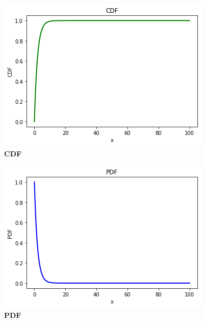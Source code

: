 \documentclass[journal,12pt,twocolumn]{IEEEtran}
\begin{document}
\begin{figure}
\includegraphics[width=\columnwidth]{figure_1.png}
    \caption{\textbf{\huge{CDF}}} 
\end{figure}
\begin{figure}
\includegraphics[width=\columnwidth]{figure_2.png}
    \caption{\textbf{\huge{PDF}}}
\end{figure}
\end{document}
